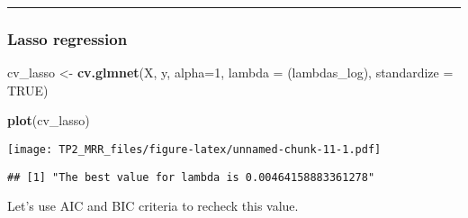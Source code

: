 \documentclass[
]{article}
\newenvironment{Shaded}{\begin{snugshade}}{\end{snugshade}}
\newcommand{\AttributeTok}[1]{\textcolor[rgb]{0.13,0.29,0.53}{#1}}
\newcommand{\CommentTok}[1]{\textcolor[rgb]{0.56,0.35,0.01}{\textit{#1}}}
\newcommand{\ConstantTok}[1]{\textcolor[rgb]{0.56,0.35,0.01}{#1}}
\newcommand{\DecValTok}[1]{\textcolor[rgb]{0.00,0.00,0.81}{#1}}
\newcommand{\FunctionTok}[1]{\textcolor[rgb]{0.13,0.29,0.53}{\textbf{#1}}}
\newcommand{\NormalTok}[1]{#1}
\newcommand{\OtherTok}[1]{\textcolor[rgb]{0.56,0.35,0.01}{#1}}
\newcommand{\SpecialCharTok}[1]{\textcolor[rgb]{0.81,0.36,0.00}{\textbf{#1}}}
\newcommand{\StringTok}[1]{\textcolor[rgb]{0.31,0.60,0.02}{#1}}
\begin{document}
\begin{center}\rule{0.5\linewidth}{0.5pt}\end{center}

\subsubsection{Lasso regression}\label{lasso-regression}

\begin{Shaded}
\begin{Highlighting}[]
\NormalTok{cv\_lasso }\OtherTok{\textless{}{-}} \FunctionTok{cv.glmnet}\NormalTok{(X, y, }\AttributeTok{alpha=}\DecValTok{1}\NormalTok{, }\AttributeTok{lambda =}\NormalTok{ (lambdas\_log), }\AttributeTok{standardize =} \ConstantTok{TRUE}\NormalTok{)}

\FunctionTok{plot}\NormalTok{(cv\_lasso)}
\end{Highlighting}
\end{Shaded}

\texttt{[image: TP2\_MRR\_files/figure-latex/unnamed-chunk-11-1.pdf]}

\begin{Shaded}
\end{Shaded}

\begin{verbatim}
## [1] "The best value for lambda is 0.00464158883361278"
\end{verbatim}

Let's use AIC and BIC criteria to recheck this value.
\end{document}
